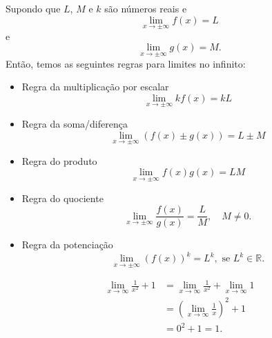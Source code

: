 \begin{obs}\label{obs:lim_regras_xinf}
Supondo que $L$, $M$ e $k$ são números reais e
\begin{equation}
  \lim_{x\to \pm\infty} f(x) = L
\end{equation}
e
\begin{equation}
  \lim_{x\to\pm\infty}g(x) = M.
\end{equation}
Então, temos as seguintes regras para limites no infinito:
\begin{itemize}
\item Regra da multiplicação por escalar
  \begin{equation}
    \lim_{x\to\pm\infty} kf(x) = kL
  \end{equation}
\item Regra da soma/diferença
  \begin{equation}
    \lim_{x\to\pm\infty} (f(x)\pm g(x)) = L\pm M
  \end{equation}
\item Regra do produto
  \begin{equation}
    \lim_{x\to\pm\infty} f(x)g(x) = LM
  \end{equation}
\item Regra do quociente
  \begin{equation}
    \lim_{x\to\pm\infty} \frac{f(x)}{g(x)} = \frac{L}{M},\quad M\neq 0.
  \end{equation}
\item Regra da potenciação
  \begin{equation}
    \lim_{x\to\pm\infty} (f(x))^k = L^k,\text{ se } L^k\in\mathbb{R}.
  \end{equation}
\end{itemize}
\end{obs}

\begin{ex}
  \begin{align}
    \lim_{x\to \infty} \frac{1}{x^2}+1 &= \lim_{x\to \infty} \frac{1}{x^2} + \lim_{x\to \infty}1 \\
                                       &= \left(\lim_{x\to\infty} \frac{1}{x}\right)^2 + 1\\
                                       &= 0^2 + 1 = 1.
\end{align}
\end{ex}

